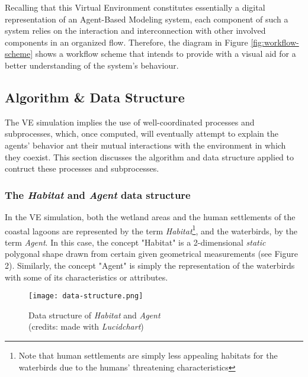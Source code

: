 Recalling that this Virtual Environment constitutes essentially a digital representation of an Agent-Based Modeling system, each component of such a system relies on the interaction and interconnection with other involved components in an organized flow. Therefore, the diagram in Figure \ref{fig:workflow-scheme} shows a workflow scheme that intends to provide with a visual aid for a better understanding of the system's behaviour.

\subsection{Algorithm \& Data Structure}
The VE simulation implies the use of well-coordinated processes and subprocesses, which, once computed, will eventually attempt to explain the agents' behavior ant their mutual interactions with the environment in which they coexist. This section discusses the algorithm and data structure applied to contruct these processes and subprocesses.

\subsubsection{The \emph{Habitat} and \emph{Agent} data structure}
In the VE simulation, both the wetland areas and the human settlements of the coastal lagoons are represented by the term \emph{Habitat}\footnote{Note that human settlements are simply less appealing habitats for the waterbirds due to the humans' threatening characteristics}, and the waterbirds, by the term \emph{Agent}. In this case, the concept "Habitat"  is a 2-dimensional \emph{static} polygonal shape drawn from certain given geometrical measurements (see Figure 2). Similarly, the concept "Agent" is simply the representation of the waterbirds with some of its characteristics or attributes.

\begin{figure}[h!]
    \centering
    \texttt{[image: data-structure.png]}
    \caption{Data structure of \emph{Habitat} and \emph{Agent} \\ (credits: made with \emph{Lucidchart})}
    \label{fig:data-structure}
\end{figure}

